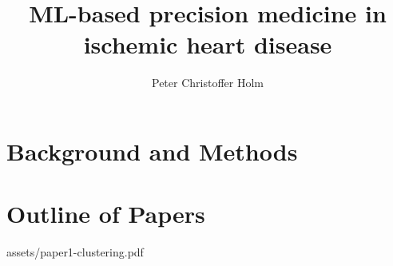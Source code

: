 \documentclass[a4paper, twoside, nobib]{tufte-book}
\title{ML-based precision medicine in ischemic heart disease}
\author[Peter Christoffer Holm]{Peter Christoffer Holm}
\begin{document}
\frontmatter
\maketitle


\cleardoublepage
\tableofcontents
\listoffigures
\listoftables


\cleardoublepage

\mainmatter %

\part{Background and Methods}

\part{Outline of Papers}



\backmatter %

\printbibliography

\mainmatter %

\appendix
\appendixpage
\addappheadtotoc
\cleardoublepage

%
    {assets/paper1-clustering.pdf}
\end{document}
